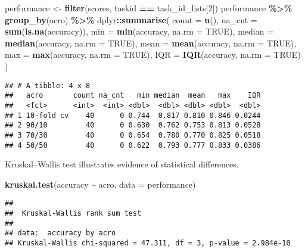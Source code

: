 \documentclass[
]{book}
\newenvironment{Shaded}{\begin{snugshade}}{\end{snugshade}}
\newcommand{\AttributeTok}[1]{\textcolor[rgb]{0.13,0.29,0.53}{#1}}
\newcommand{\ConstantTok}[1]{\textcolor[rgb]{0.56,0.35,0.01}{#1}}
\newcommand{\DecValTok}[1]{\textcolor[rgb]{0.00,0.00,0.81}{#1}}
\newcommand{\FunctionTok}[1]{\textcolor[rgb]{0.13,0.29,0.53}{\textbf{#1}}}
\newcommand{\NormalTok}[1]{#1}
\newcommand{\OtherTok}[1]{\textcolor[rgb]{0.56,0.35,0.01}{#1}}
\newcommand{\SpecialCharTok}[1]{\textcolor[rgb]{0.81,0.36,0.00}{\textbf{#1}}}
\begin{document}
\begin{Shaded}
\begin{Highlighting}[]
\NormalTok{performance }\OtherTok{\textless{}{-}} \FunctionTok{filter}\NormalTok{(scores, taskid }\SpecialCharTok{==}\NormalTok{ task\_id\_lists[}\DecValTok{2}\NormalTok{])}
\NormalTok{performance }\SpecialCharTok{\%\textgreater{}\%}
  \FunctionTok{group\_by}\NormalTok{(acro) }\SpecialCharTok{\%\textgreater{}\%}
\NormalTok{  dplyr}\SpecialCharTok{::}\FunctionTok{summarise}\NormalTok{(}
    \AttributeTok{count =} \FunctionTok{n}\NormalTok{(),}
    \AttributeTok{na\_cnt =} \FunctionTok{sum}\NormalTok{(}\FunctionTok{is.na}\NormalTok{(accuracy)),}
    \AttributeTok{min =} \FunctionTok{min}\NormalTok{(accuracy, }\AttributeTok{na.rm =} \ConstantTok{TRUE}\NormalTok{),}
    \AttributeTok{median =} \FunctionTok{median}\NormalTok{(accuracy, }\AttributeTok{na.rm =} \ConstantTok{TRUE}\NormalTok{),}
    \AttributeTok{mean =} \FunctionTok{mean}\NormalTok{(accuracy, }\AttributeTok{na.rm =} \ConstantTok{TRUE}\NormalTok{),}
    \AttributeTok{max =} \FunctionTok{max}\NormalTok{(accuracy, }\AttributeTok{na.rm =} \ConstantTok{TRUE}\NormalTok{),}
    \AttributeTok{IQR =} \FunctionTok{IQR}\NormalTok{(accuracy, }\AttributeTok{na.rm =} \ConstantTok{TRUE}\NormalTok{)}
\NormalTok{  )}
\end{Highlighting}
\end{Shaded}

\begin{verbatim}
## # A tibble: 4 x 8
##   acro       count na_cnt   min median  mean   max    IQR
##   <fct>      <int>  <int> <dbl>  <dbl> <dbl> <dbl>  <dbl>
## 1 10-fold cv    40      0 0.744  0.817 0.810 0.846 0.0244
## 2 90/10         40      0 0.630  0.762 0.753 0.813 0.0528
## 3 70/30         40      0 0.654  0.780 0.770 0.825 0.0518
## 4 50/50         40      0 0.622  0.793 0.777 0.833 0.0386
\end{verbatim}

Kruskal--Wallis test illustrates evidence of statistical differences.

\begin{Shaded}
\begin{Highlighting}[]
\FunctionTok{kruskal.test}\NormalTok{(accuracy }\SpecialCharTok{\textasciitilde{}}\NormalTok{ acro, }\AttributeTok{data =}\NormalTok{ performance)}
\end{Highlighting}
\end{Shaded}

\begin{verbatim}
## 
##  Kruskal-Wallis rank sum test
## 
## data:  accuracy by acro
## Kruskal-Wallis chi-squared = 47.311, df = 3, p-value = 2.984e-10
\end{verbatim}
\end{document}

